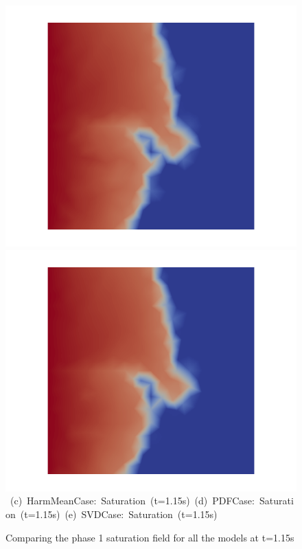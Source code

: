 \begin{landscape}
\begin{figure}[ht]
{{      \includegraphics[width=.56\textwidth]{./Pics/PDFCase/PDFCase_Saturation_t_1dot15.png} 
      \includegraphics[width=.56\textwidth]{./Pics/SVDCase/SVDCase_Saturation_t_1dot15.png}}
\vspace{0.cm}
\hbox{ \hspace{0cm} (c) HarmMeanCase: Saturation (t=1.15s) \hspace{0.5cm} (d) PDFCase: Saturation (t=1.15s) \hspace{1.5cm} (e) SVDCase: Saturation (t=1.15s)}
\vspace{0.cm}
}   
\caption{Comparing the phase 1 saturation field for all the models at t=1.15s}
\label{fig:Saturationfield@t=1.15s}
\end{figure}
\end{landscape}
\clearpage
